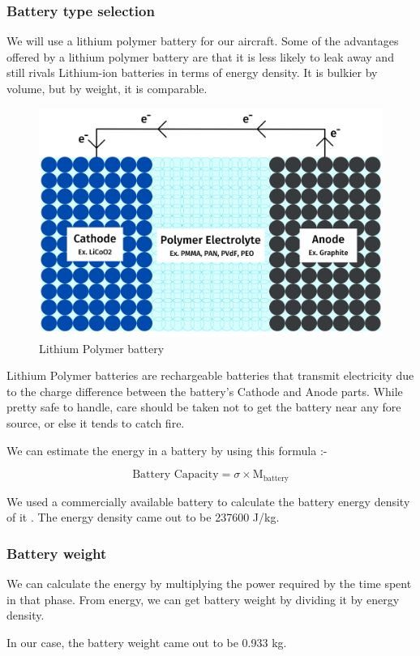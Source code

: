 \documentclass[12 pt]{article}
\begin{document}
\subsubsection{Battery type selection \cite{Lipobattery}}
We will use a lithium polymer battery for our aircraft. Some of the advantages offered by a lithium polymer battery are that it is less likely to leak away and still rivals Lithium-ion batteries in terms of energy density. It is bulkier by volume, but by weight, it is comparable.

\begin{figure}[h]
    \centering
    \includegraphics[width=0.5\linewidth]{Extra pics/LiPo_battery_diagram.png}
    \caption{Lithium Polymer battery}
    \label{Lithium Polymer battery}
\end{figure}

Lithium Polymer batteries are rechargeable batteries that transmit electricity due to the charge difference between the battery's Cathode and Anode parts. While pretty safe to handle, care should be taken not to get the battery near any fore source, or else it tends to catch fire.

We can estimate the energy in a battery by using this formula \cite{Lipobattery}:-

$$ \text{Battery Capacity} = \sigma \times \text{M}_\text{battery} $$

We used a commercially available battery to calculate the battery energy density of it \cite{Batteryref}. The energy density came out to be 237600 J/kg.

\subsubsection{Battery weight}

We can calculate the energy by multiplying the power required by the time spent in that phase. From energy, we can get battery weight by dividing it by energy density. 

In our case, the battery weight came out to be 0.933 kg.
\end{document}
